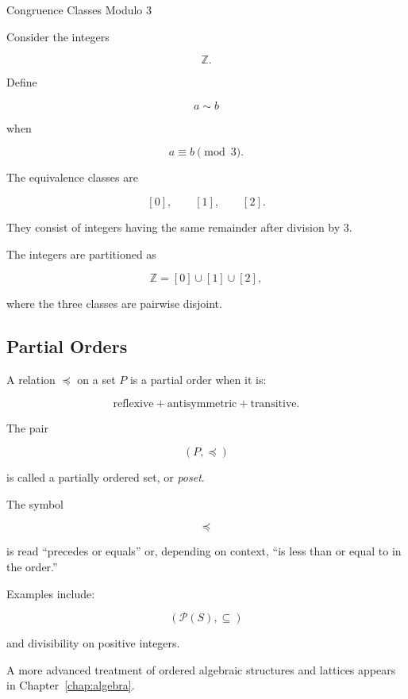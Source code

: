 \begin{workedexamplebox}{Congruence Classes Modulo \(3\)}

Consider the integers

\[
\mathbb{Z}.
\]

Define

\[
a\sim b
\]

when

\[
a\equiv b\pmod 3.
\]

The equivalence classes are

\[
[0],
\qquad
[1],
\qquad
[2].
\]

They consist of integers having the same remainder after division by
\(3\).

\begin{answerbox}
The integers are partitioned as

\[
\boxed{
\mathbb{Z}
=
[0]\cup[1]\cup[2],
}
\]

where the three classes are pairwise disjoint.
\end{answerbox}

\end{workedexamplebox}

\subsection{Partial Orders}
\label{subsec:partial-orders-discrete}

A relation \(\preceq\) on a set \(P\) is a partial order when it is:

\[
\boxed{
\text{reflexive}
+
\text{antisymmetric}
+
\text{transitive}.
}
\]

The pair

\[
(P,\preceq)
\]

is called a partially ordered set, or \emph{poset}.

The symbol

\[
\preceq
\]

is read ``precedes or equals'' or, depending on context, ``is less than
or equal to in the order.''

Examples include:

\[
(\mathcal{P}(S),\subseteq)
\]

and divisibility on positive integers.

A more advanced treatment of ordered algebraic structures and lattices
appears in Chapter~\ref{chap:algebra}.

